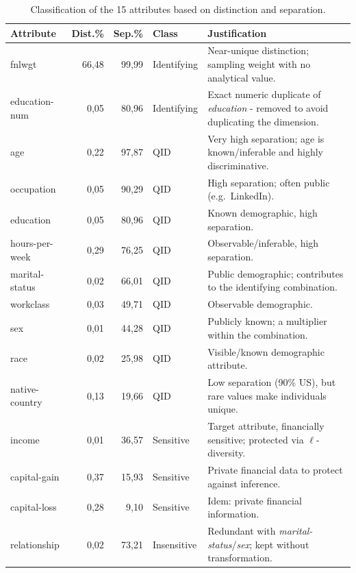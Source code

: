 \documentclass[10pt,a4paper]{article}
\begin{document}
\begin{table}[h]
\centering\footnotesize
\begin{tabular}{l r r l p{6.6cm}}
\toprule
\textbf{Attribute} & \textbf{Dist.\%} & \textbf{Sep.\%} & \textbf{Class} & \textbf{Justification} \\
\midrule
fnlwgt          & 66{,}48 & 99{,}99 & Identifying & Near-unique distinction; sampling weight with no analytical value. \\
education-num   & 0{,}05  & 80{,}96 & Identifying & Exact numeric duplicate of \textit{education} - removed to avoid duplicating the dimension. \\
age             & 0{,}22  & 97{,}87 & QID & Very high separation; age is known/inferable and highly discriminative. \\
occupation      & 0{,}05  & 90{,}29 & QID & High separation; often public (e.g.\ LinkedIn). \\
education       & 0{,}05  & 80{,}96 & QID & Known demographic, high separation. \\
hours-per-week  & 0{,}29  & 76{,}25 & QID & Observable/inferable, high separation. \\
marital-status  & 0{,}02  & 66{,}01 & QID & Public demographic; contributes to the identifying combination. \\
workclass       & 0{,}03  & 49{,}71 & QID & Observable demographic. \\
sex             & 0{,}01  & 44{,}28 & QID & Publicly known; a multiplier within the combination. \\
race            & 0{,}02  & 25{,}98 & QID & Visible/known demographic attribute. \\
native-country  & 0{,}13  & 19{,}66 & QID & Low separation (90\% US), but rare values make individuals unique. \\
income          & 0{,}01  & 36{,}57 & Sensitive & Target attribute, financially sensitive; protected via $\ell$-diversity. \\
capital-gain    & 0{,}37  & 15{,}93 & Sensitive & Private financial data to protect against inference. \\
capital-loss    & 0{,}28  & 9{,}10  & Sensitive & Idem: private financial information. \\
relationship    & 0{,}02  & 73{,}21 & Insensitive & Redundant with \textit{marital-status}/\textit{sex}; kept without transformation. \\
\bottomrule
\end{tabular}
\caption{Classification of the 15 attributes based on distinction and separation.}
\label{tab:class}
\end{table}
\end{document}
